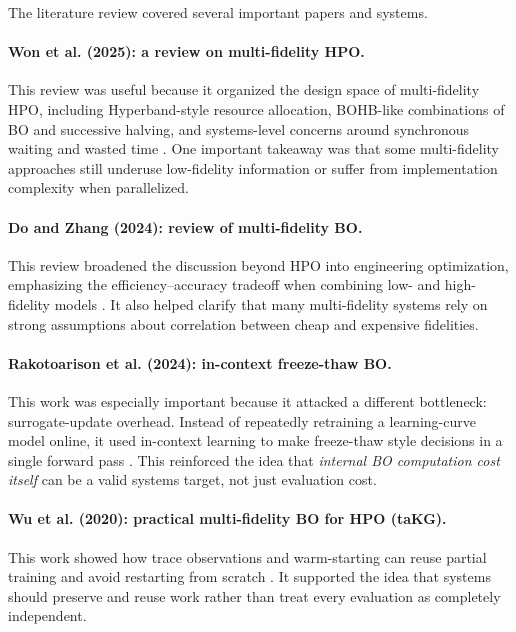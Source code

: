 \documentclass[11pt]{article}
\begin{document}
The literature review covered several important papers and systems.

\paragraph{Won et al. (2025): a review on multi-fidelity HPO.}
This review was useful because it organized the design space of multi-fidelity HPO, including Hyperband-style resource allocation, BOHB-like combinations of BO and successive halving, and systems-level concerns around synchronous waiting and wasted time \cite{won2025review}. One important takeaway was that some multi-fidelity approaches still underuse low-fidelity information or suffer from implementation complexity when parallelized.

\paragraph{Do and Zhang (2024): review of multi-fidelity BO.}
This review broadened the discussion beyond HPO into engineering optimization, emphasizing the efficiency--accuracy tradeoff when combining low- and high-fidelity models \cite{do2024review}. It also helped clarify that many multi-fidelity systems rely on strong assumptions about correlation between cheap and expensive fidelities.

\paragraph{Rakotoarison et al. (2024): in-context freeze-thaw BO.}
This work was especially important because it attacked a different bottleneck: surrogate-update overhead. Instead of repeatedly retraining a learning-curve model online, it used in-context learning to make freeze-thaw style decisions in a single forward pass \cite{rakotoarison2024ifbo}. This reinforced the idea that \emph{internal BO computation cost itself} can be a valid systems target, not just evaluation cost.

\paragraph{Wu et al. (2020): practical multi-fidelity BO for HPO (taKG).}
This work showed how trace observations and warm-starting can reuse partial training and avoid restarting from scratch \cite{wu2020takg}. It supported the idea that systems should preserve and reuse work rather than treat every evaluation as completely independent.
\end{document}
